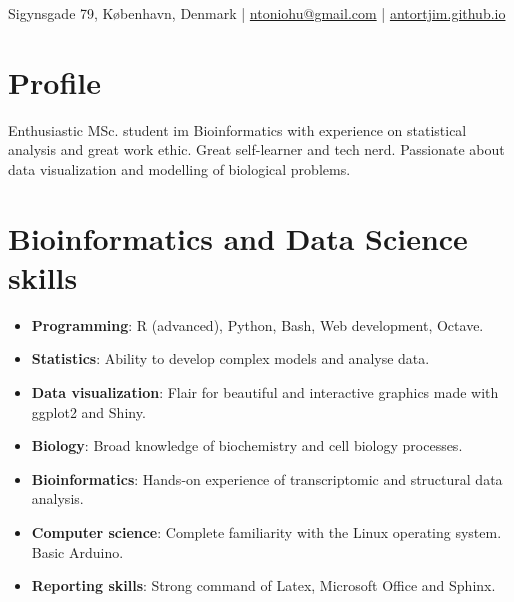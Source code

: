 \documentclass[paper=a4,fontsize=11pt]{article}
\newcommand{\sepspace}{\vspace*{1em}}		%
\newcommand{\MyName}[1]{ %
		\Huge \usefont{OT1}{phv}{b}{n} \hfill #1
		\par \normalsize \normalfont}
\newcommand{\MySlogan}[1]{ %
		\large \usefont{OT1}{phv}{m}{n}\hfill \textit{#1}
		\par \normalsize \normalfont}
\newcommand{\NewPart}[1]{\section*{
{#1}}}
\begin{document}

%

\thispagestyle{fancy}



\def\name{}
\centerline{\name}
\vspace{10pt}
\centerline{
Sigynsgade 79, K{\o}benhavn, Denmark
|
\href{mailto:ntoniogu@gmail.com}{ntoniohu@gmail.com}
|
\href{https://antortjim.github.io}{antortjim.github.io}
}

%


\NewPart{Profile}

Enthusiastic MSc. student im Bioinformatics with experience on statistical analysis and great work ethic. Great self-learner and tech nerd. Passionate about data visualization and modelling of biological problems.


\NewPart{Bioinformatics and Data Science skills}

\begin{itemize}

\item \textbf{Programming}: R (advanced), Python, Bash, Web development, Octave.
\item \textbf{Statistics}: Ability to develop complex models and analyse data.
\item \textbf{Data visualization}: Flair for beautiful and interactive graphics made with ggplot2 and Shiny.
\item \textbf{Biology}: Broad knowledge of biochemistry and cell biology processes.
\item \textbf{Bioinformatics}: Hands-on experience of transcriptomic and structural data analysis.
\item \textbf{Computer science}: Complete familiarity with the Linux operating system.  Basic Arduino.
\item \textbf{Reporting skills}: Strong command of Latex, Microsoft Office and Sphinx.
\end{itemize}
\end{document}
